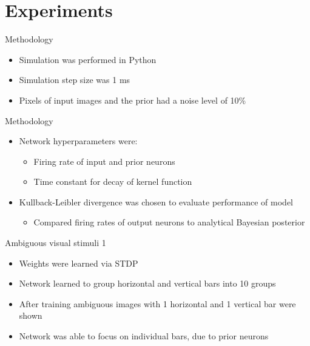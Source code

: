 \documentclass[aspectratio=169]{beamer}
\begin{document}
\section{Experiments}

\begin{frame}{Methodology}
\begin{itemize}
	\item Simulation was performed in Python
	\item Simulation step size was 1 ms
	\item Pixels of input images and the prior had a noise level of 10\%
\end{itemize}
\end{frame}

\begin{frame}{Methodology}
\begin{itemize}
      \item Network hyperparameters were:
      \begin{itemize}
        \item Firing rate of input and prior neurons
        \item Time constant for decay of kernel function
      \end{itemize}
	\item Kullback-Leibler divergence was chosen to evaluate performance of model
	\begin{itemize}
	  \item Compared firing rates of output neurons to analytical Bayesian posterior
	\end{itemize}
\end{itemize}
\end{frame}

\begin{frame}{Ambiguous visual stimuli 1}
  \begin{itemize}
    \item Weights were learned via STDP
    \item Network learned to group horizontal and vertical bars into 10 groups
    \item After training ambiguous images with 1 horizontal and 1 vertical bar were shown
    \item Network was able to focus on individual bars, due to prior neurons
  \end{itemize}
\end{frame}
\end{document}
